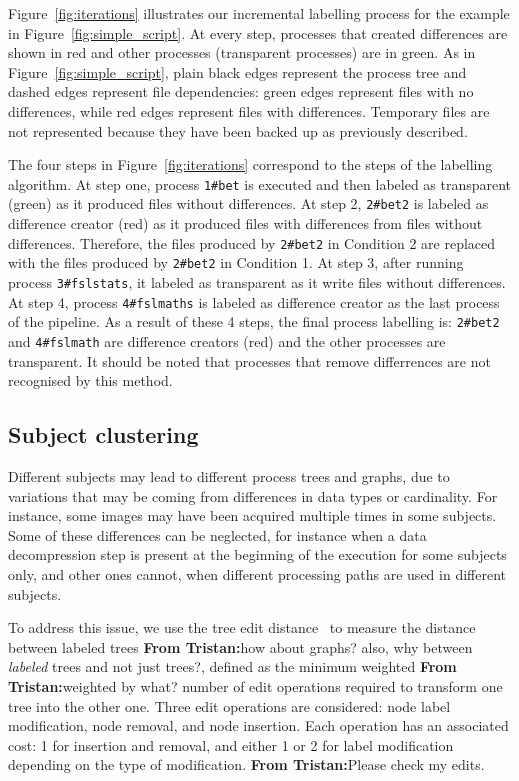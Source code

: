 \documentclass[a4paper,num-refs]{oup-contemporary}
\newcommand{\tristan}[1]{\color{blue}\textbf{From Tristan:}#1\color{black}}
\begin{document}
Figure~\ref{fig:iterations} illustrates our incremental labelling 
process for the example in Figure~\ref{fig:simple_script}. At every 
step, processes that created differences are shown in red and other processes 
(transparent processes) are in green. As in 
Figure~\ref{fig:simple_script}, plain black edges represent the process 
tree and dashed edges represent file dependencies: green edges 
represent files with no differences, while red edges represent files with 
differences. Temporary files are not represented because they have been 
backed up as previously described.

The four steps in Figure~\ref{fig:iterations} correspond to the 
steps of the labelling algorithm. 
At step one, process \texttt{1\#bet} is executed and then labeled 
as transparent (green) as it produced files without differences.
At step 2, \texttt{2\#bet2} 
is labeled as difference creator (red) as it produced files with differences 
from files without differences. Therefore, the files produced by \texttt{2\#bet2} in  
Condition 2 are replaced with the files produced by \texttt{2\#bet2} in 
Condition 1.
At step 3, after running process \texttt{3\#fslstats}, it labeled as 
transparent as it write files without differences.
At step 4, process \texttt{4\#fslmaths} is labeled as difference creator 
as the last process of the pipeline.
As a result of these 4 steps, the final process labelling is: 
\texttt{2\#bet2} and \texttt{4\#fslmath} are difference creators (red) 
and the other processes are transparent.
It should be noted that processes that remove differrences are not recognised 
by this method.

\subsection{Subject clustering}

Different subjects may lead to different process trees and graphs, due to
variations that may be coming from differences in data types or
cardinality. For instance, some images may have been acquired multiple
times in some subjects. Some of these differences can be neglected, for
instance when a data decompression step is present at the beginning of the
execution for some subjects only, and other ones cannot, when different
processing paths are used in different subjects.

To address this issue, we use the tree edit distance~\cite{zhang1989simple}
to measure the distance between labeled trees \tristan{how about graphs?
also, why between \emph{labeled} trees and not just trees?}, defined as the
minimum weighted \tristan{weighted by what?} number of edit operations
required to transform one tree into the other one. Three edit operations
are considered: node label modification, node removal, and node insertion.
Each operation has an associated cost: 1 for insertion and removal, and
either 1 or 2 for label modification depending on the type of modification. \tristan{Please check my edits.}
\end{document}
